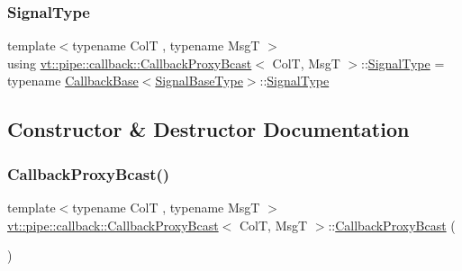 \subsubsection{\texorpdfstring{Signal\+Type}{SignalType}}
{\footnotesize\ttfamily template$<$typename ColT , typename MsgT $>$ \\
using \hyperlink{structvt_1_1pipe_1_1callback_1_1_callback_proxy_bcast}{vt\+::pipe\+::callback\+::\+Callback\+Proxy\+Bcast}$<$ ColT, MsgT $>$\+::\hyperlink{structvt_1_1pipe_1_1callback_1_1_callback_proxy_bcast_a152bf72e620b884defce792be43860d2}{Signal\+Type} =  typename \hyperlink{structvt_1_1pipe_1_1callback_1_1_callback_base}{Callback\+Base}$<$\hyperlink{structvt_1_1pipe_1_1callback_1_1_callback_proxy_bcast_a4ed994346a98d36d5d70c07a3d1e1dfb}{Signal\+Base\+Type}$>$\+::\hyperlink{structvt_1_1pipe_1_1callback_1_1_callback_proxy_bcast_a152bf72e620b884defce792be43860d2}{Signal\+Type}}



\subsection{Constructor \& Destructor Documentation}
\mbox{\label{structvt_1_1pipe_1_1callback_1_1_callback_proxy_bcast_a0f65df639ce4c3a9760b50107defbcad}} 
\subsubsection{\texorpdfstring{Callback\+Proxy\+Bcast()}{CallbackProxyBcast()}\hspace{0.1cm}{\footnotesize\ttfamily [1/4]}}
{\footnotesize\ttfamily template$<$typename ColT , typename MsgT $>$ \\
\hyperlink{structvt_1_1pipe_1_1callback_1_1_callback_proxy_bcast}{vt\+::pipe\+::callback\+::\+Callback\+Proxy\+Bcast}$<$ ColT, MsgT $>$\+::\hyperlink{structvt_1_1pipe_1_1callback_1_1_callback_proxy_bcast}{Callback\+Proxy\+Bcast} (\begin{DoxyParamCaption}{ }\end{DoxyParamCaption})\hspace{0.3cm}{\ttfamily [default]}}

